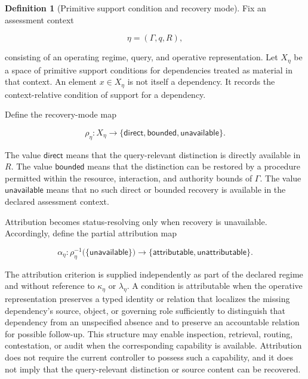 \documentclass[11pt]{article}
\theoremstyle{definition}
\newtheorem{definition}[proposition]{Definition}
\theoremstyle{remark}
\begin{document}
\begin{definition}[Primitive support condition and recovery mode]
\label{def:primitive-support-condition}
Fix an assessment context

\[
\eta=(\Gamma,q,R),
\]

consisting of an operating regime, query, and operative representation. Let \(X_{\eta}\) be a space of primitive support conditions for dependencies treated as material in that context. An element \(x\in X_{\eta}\) is not itself a dependency. It records the context-relative condition of support for a dependency.

Define the recovery-mode map

\[
\rho_{\eta}:X_{\eta}\rightarrow
\{
\mathsf{direct},
\mathsf{bounded},
\mathsf{unavailable}
\}.
\]

The value \(\mathsf{direct}\) means that the query-relevant distinction is directly available in \(R\). The value \(\mathsf{bounded}\) means that the distinction can be restored by a procedure permitted within the resource, interaction, and authority bounds of \(\Gamma\). The value \(\mathsf{unavailable}\) means that no such direct or bounded recovery is available in the declared assessment context.
\end{definition}

Attribution becomes status-resolving only when recovery is unavailable. Accordingly, define the partial attribution map

\[
\alpha_{\eta}:
\rho_{\eta}^{-1}
\bigl(
\{\mathsf{unavailable}\}
\bigr)
\rightarrow
\{
\mathsf{attributable},
\mathsf{unattributable}
\}.
\]

The attribution criterion is supplied independently as part of the declared regime and without reference to \(\kappa_{\eta}\) or \(\lambda_{\eta}\). A condition is attributable when the operative representation preserves a typed identity or relation that localizes the missing dependency's source, object, or governing role sufficiently to distinguish that dependency from an unspecified absence and to preserve an accountable relation for possible follow-up. This structure may enable inspection, retrieval, routing, contestation, or audit when the corresponding capability is available. Attribution does not require the current controller to possess such a capability, and it does not imply that the query-relevant distinction or source content can be recovered.
\end{document}
